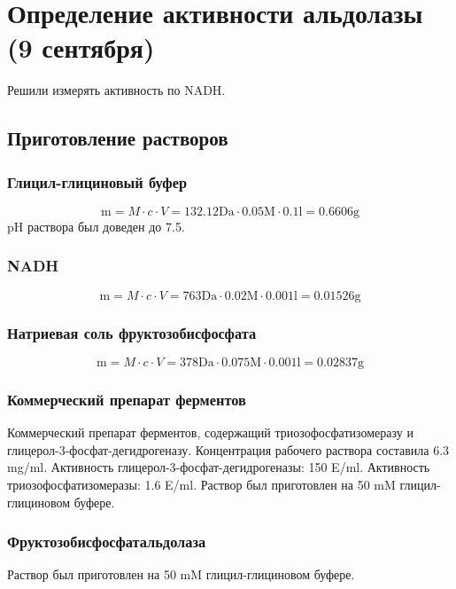 \section{Определение активности альдолазы (9 сентября)}

Решили измерять активность по NADH.

\subsection{Приготовление растворов}

\subsubsection{Глицил-глициновый буфер}
$$ \text{m} = M \cdot c \cdot V =
    132.12 \text{Da} \cdot 0.05 \text{M} \cdot 0.1 \text{l} = 0.6606 \text {g} $$
pH раствора был доведен до 7.5.

\subsubsection{NADH}
$$ \text{m} = M \cdot c \cdot V =
    763 \text{Da} \cdot 0.02 \text{M} \cdot 0.001 \text{l} = 0.01526 \text {g} $$

\subsubsection{Натриевая соль фруктозобисфосфата}
$$ \text{m} = M \cdot c \cdot V =
    378 \text{Da} \cdot 0.075 \text{M} \cdot 0.001 \text{l} = 0.02837 \text {g} $$

\subsubsection{Коммерческий препарат ферментов}
Коммерческий препарат ферментов, содержащий триозофосфатизомеразу и
глицерол-3-фосфат-дегидрогеназу.
Концентрация рабочего раствора составила 6.3 mg/ml.
Активность глицерол-3-фосфат-дегидрогеназы: 150 E/ml.
Активность триозофосфатизомеразы: 1.6 E/ml.
Раствор был приготовлен на 50 mM глицил-глициновом буфере.

\subsubsection{Фруктозобисфосфатальдолаза}
Раствор был приготовлен на 50 mM глицил-глициновом буфере.

